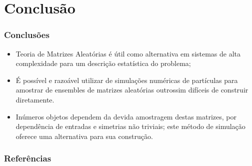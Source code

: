 \begin{frame}
\end{frame}


\section{Conclusão}

\begin{frame}
	\frametitle{Conclusões}
	
	\begin{itemize}
		\item<1> Teoria de Matrizes Aleatórias é útil como alternativa em sistemas de alta complexidade para um descrição estatística do problema;
		\item<2> É possível e razoável utilizar de simulações numéricas de partículas para amostrar de ensembles de matrizes aleatórias outrossim difíceis de construir diretamente.
		\item<3> Inúmeros objetos dependem da devida amostragem destas matrizes, por dependência de entradas e simetrias não triviais; este método de simulação oferece uma alternativa para sua construção.
	\end{itemize}
\end{frame}

\begin{frame}[allowframebreaks]
	\frametitle{Referências}
	
\end{frame}

